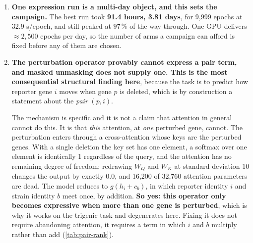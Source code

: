 \begin{enumerate}
  \emph{Correction to revision 2, which overstated (ii).} It said  ``never returns
  below 1'', so the model was ``no better than the mean''. Read on the raw logged curve
  rather than the smoothed one,  at the raw Pearson maximum is $0.9928$, just
  \emph{below} 1, while at the smoothed maximum it is $1.0070$, just above. The two readings
  are about $1.8\sigma$ apart in epoch-to-epoch noise (\cref{tab:nmse-parity}), so the sign
  of ``beats the mean'' is not resolvable and the defensible word is \textbf{parity}. The
  under-shrinkage ratio, unlike that sign, is nowhere near a boundary.

  \emph{And on the objection that squared error ``looks minimized at the beginning'':} raw
   falls steeply, rises to a local maximum near epoch 900, then falls again to a
  \emph{late global} minimum at epoch 9,184, essentially at the Pearson peak. It does come
  back, and it goes lower (\cref{fig:objective}b).

\item \textbf{One expression run is a multi-day object, and this sets the campaign.} The
  best run took \textbf{91.4 hours, 3.81 days}, for 9,999 epochs at 32.9 s/epoch, and still
  peaked at $97\,\%$ of the way through. One GPU delivers $\approx 2{,}500$ epochs per day,
  so the number of arms a campaign can afford is fixed before any of them are chosen.

\item \textbf{The perturbation operator provably cannot express a pair term, and masked
  unmasking does not supply one. This is the most consequential structural finding here},
  because the task is to predict how reporter gene $i$ moves when gene $p$ is deleted, which
  is by construction a statement about the \emph{pair} $(p, i)$.

  The mechanism is specific and it is not a claim that attention in general cannot do this.
  It is that \emph{this} attention, at \emph{one} perturbed gene, cannot. The perturbation
  enters through a cross-attention whose keys are the perturbed genes. With a single
  deletion the key set has one element, a softmax over one element is identically 1
  regardless of the query, and the attention has no remaining degree of freedom: redrawing
  $W_Q$ and $W_K$ at standard deviation 10 changes the output by exactly $0.0$, and 16,200
  of 32,760 attention parameters are dead. The model reduces to $g(h_i + c_b)$, in which
  reporter identity $i$ and strain identity $b$ meet once, by addition. \textbf{So yes: this
  operator only becomes expressive when more than one gene is perturbed}, which is why it
  works on the trigenic task and degenerates here. Fixing it does not require abandoning
  attention, it requires a term in which $i$ and $b$ multiply rather than add
  (\cref{tab:pair-rank}).


\end{enumerate}
